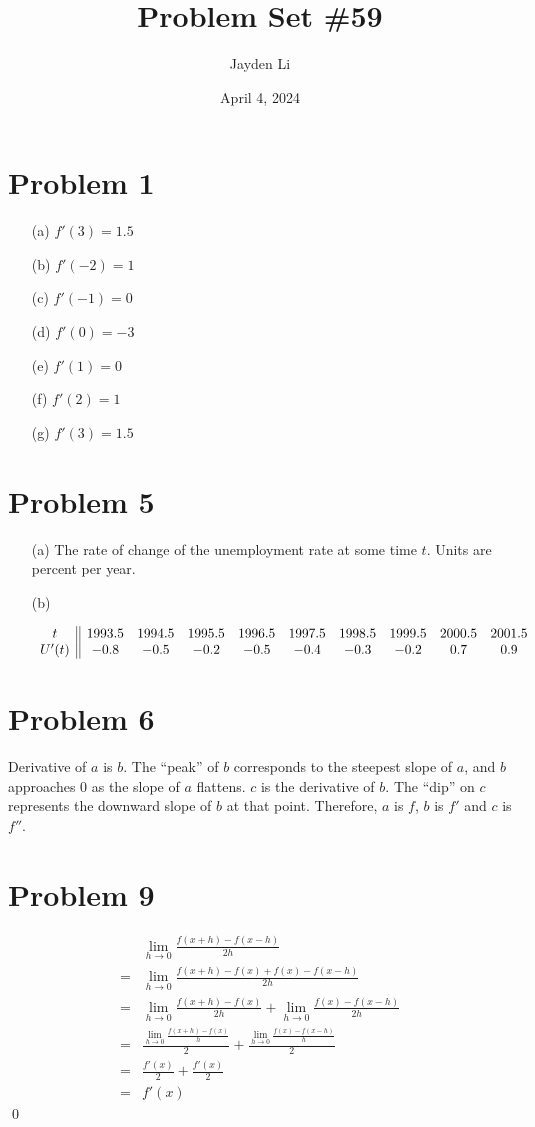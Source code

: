 \documentclass{article}
\title{Problem Set \#59}
\author{Jayden Li}
\date{April 4, 2024}
\newcommand*{\problem}[1]{\section*{Problem #1}}
\newcommand*{\limit}[2][x]{\ensuremath{\displaystyle\lim_{#1\to#2}}}
\begin{document}
\fontsize{12pt}{12pt}\selectfont
\setlength{\abovedisplayskip}{0pt}
\maketitle

\problem{1}
\begin{multicols}{4}
	\begin{itemize}
		\item[(a)] $f'(3)=1.5$
		\item[(b)] $f'(-2)=1$
		\item[(c)] $f'(-1)=0$
		\item[(d)] $f'(0)=-3$
		\item[(e)] $f'(1)=0$
		\item[(f)] $f'(2)=1$
		\item[(g)] $f'(3)=1.5$
	\end{itemize}
\end{multicols}

\problem{5}
\begin{itemize}
	\item[(a)]
	The rate of change of the unemployment rate at some time $t$. Units are percent per year.

	\item[(b)]
	\phantom{}
	\begin{center}
		$\begin{array}{ c || c c c c c c c c c }
			t & 1993.5 & 1994.5 & 1995.5 & 1996.5 & 1997.5 & 1998.5 & 1999.5 & 2000.5 & 2001.5 \\
			U'(t) & -0.8 & -0.5 & -0.2 & -0.5 & -0.4 & -0.3 & -0.2 & 0.7 & 0.9
		\end{array}$
	\end{center}
\end{itemize}

\problem{6}
Derivative of $a$ is $b$. The ``peak'' of $b$ corresponds to the steepest slope of $a$, and $b$ approaches $0$ as the slope of $a$ flattens. $c$ is the derivative of $b$. The ``dip'' on $c$ represents the downward slope of $b$ at that point. Therefore, $a$ is $f$, $b$ is $f'$ and $c$ is $f''$.

\problem{9}
\begin{align*}
	&\limit[h]{0}\frac{f(x+h)-f(x-h)}{2h} \\
	={}&\limit[h]{0}\frac{f(x+h)-f(x)+f(x)-f(x-h)}{2h} \\
	={}&\limit[h]{0}\frac{f(x+h)-f(x)}{2h}+\limit[h]{0}\frac{f(x)-f(x-h)}{2h} \\
	={}&\frac{\limit[h]{0}\frac{f(x+h)-f(x)}{h}}{2}+\frac{\limit[h]{0}\frac{f(x)-f(x-h)}{h}}{2} \\
	={}&\frac{f'(x)}{2}+\frac{f'(x)}{2} \\
	={}&f'(x)
\end{align*}
\qed
\end{document}
